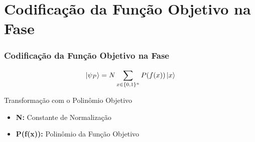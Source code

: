 \documentclass[aspectratio=169]{beamer}
\begin{document}

\section{Codificação da Função Objetivo na Fase}

\begin{frame}
    \frametitle{Codificação da Função Objetivo na Fase}

    \[
        \ket{\psi_P}=N \sum_{x\in\{0,1\}^n}P(f(x))\ket{x}
    \]

    \begin{block}{Transformação com o Polinômio Objetivo}
        \begin{itemize}
            \item \textbf{N:} Constante de Normalização
            \item \textbf{P(f(x)):} Polinômio da Função Objetivo
        \end{itemize}
    \end{block}
\end{frame}
\end{document}
